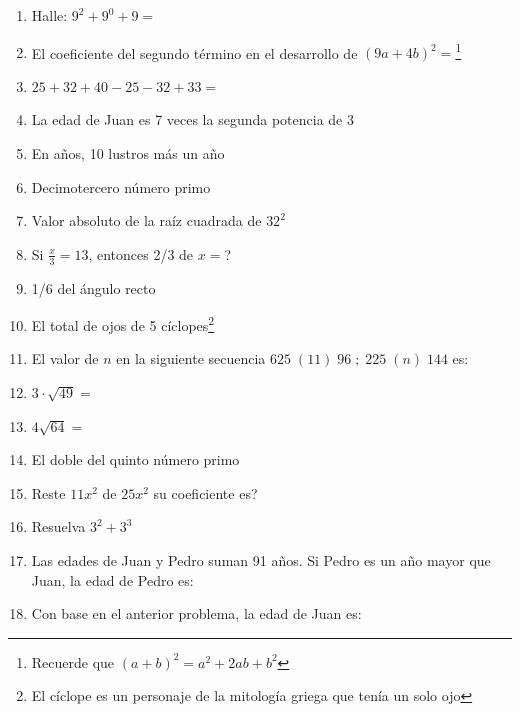 \documentclass[letterpaper,10pt,twoside]{article}
\begin{document}
\begin{multicols}{2}
\begin{enumerate}
 \item Halle: $9^{2}+9^{0}+9=$
 \item El coeficiente del segundo término en el desarrollo de $(9a+4b)^{2}=$\footnote{Recuerde que $(a+b)^{2}=a^{2}+2ab+b^{2}$}
 \item $25+32+40-25-32+33=$
 \item La edad de Juan es 7 veces la segunda potencia de 3
 \item En años, 10 lustros más un año
 \item Decimotercero número primo
 \item Valor absoluto de la raíz cuadrada de $32^{2}$
 \item Si $\frac{x}{3}=13$, entonces 2/3 de $x=$?
 \item 1/6 del ángulo recto
 \item El total de ojos de 5 cíclopes\footnote{El cíclope es un personaje de la mitología griega que tenía un solo ojo}
 \item El valor de $n$ en la siguiente secuencia $625\;(11)\;96\; ; \;225\;(n)\;144$ es:
 \item $3\cdot\sqrt{49}=$
 \item $4\sqrt{64}=$
 \item El doble del quinto número primo
 \item Reste $11x^{2}$ de $25x^{2}$ su coeficiente es?
 \item Resuelva $3^{2}+3^{3}$
 \item Las edades de Juan y Pedro suman 91 años. Si Pedro es un año mayor que Juan, la edad de Pedro es:
 \item Con base en el anterior problema, la edad de Juan es:
 \end{enumerate}
\end{multicols}
\end{document}
